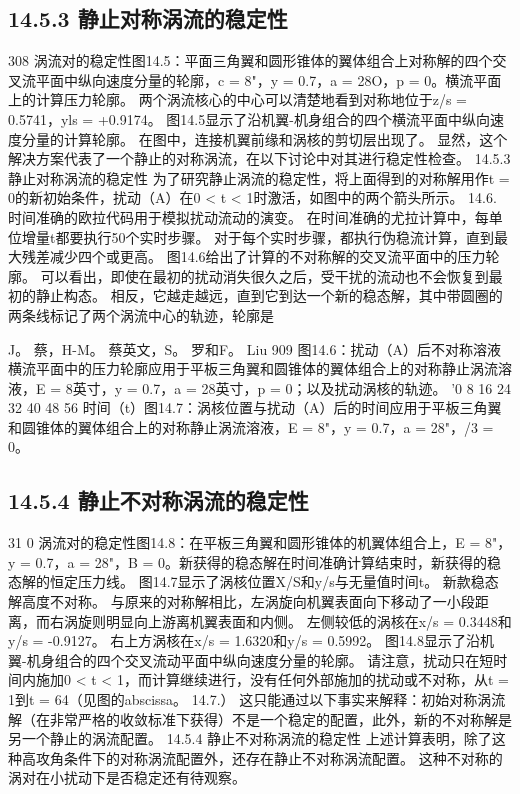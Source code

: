 \documentclass[UTF8,11pt,a4paper,openany,fontset=fandol]{ctexbook}
\begin{document}
\subsection{14.5.3 静止对称涡流的稳定性}
308 涡流对的稳定性图14.5：平面三角翼和圆形锥体的翼体组合上对称解的四个交叉流平面中纵向速度分量的轮廓，c = 8"，y = 0.7，a = 28O，p = 0。横流平面上的计算压力轮廓。 两个涡流核心的中心可以清楚地看到对称地位于z/s = 0.5741，yls = +0.9174。 图14.5显示了沿机翼-机身组合的四个横流平面中纵向速度分量的计算轮廓。 在图中，连接机翼前缘和涡核的剪切层出现了。 显然，这个解决方案代表了一个静止的对称涡流，在以下讨论中对其进行稳定性检查。 14.5.3 静止对称涡流的稳定性 为了研究静止涡流的稳定性，将上面得到的对称解用作t = 0的新初始条件，扰动（A）在0 < t < 1时激活，如图中的两个箭头所示。 14.6. 时间准确的欧拉代码用于模拟扰动流动的演变。 在时间准确的尤拉计算中，每单位增量t都要执行50个实时步骤。 对于每个实时步骤，都执行伪稳流计算，直到最大残差减少四个或更高。 图14.6给出了计算的不对称解的交叉流平面中的压力轮廓。 可以看出，即使在最初的扰动消失很久之后，受干扰的流动也不会恢复到最初的静止构态。 相反，它越走越远，直到它到达一个新的稳态解，其中带圆圈的两条线标记了两个涡流中心的轨迹，轮廓是

J。 蔡，H-M。 蔡英文，S。 罗和F。 Liu 909 图14.6：扰动（A）后不对称溶液横流平面中的压力轮廓应用于平板三角翼和圆锥体的翼体组合上的对称静止涡流溶液，E = 8英寸，y = 0.7，a = 28英寸，p = 0；以及扰动涡核的轨迹。 '0 8 16 24 32 40 48 56 时间（t）图14.7：涡核位置与扰动（A）后的时间应用于平板三角翼和圆锥体的翼体组合上的对称静止涡流溶液，E = 8"，y = 0.7，a = 28"，/3 = 0。

\subsection{14.5.4 静止不对称涡流的稳定性}
31 0 涡流对的稳定性图14.8：在平板三角翼和圆形锥体的机翼体组合上，E = 8"，y = 0.7，a = 28"，B = 0。新获得的稳态解在时间准确计算结束时，新获得的稳态解的恒定压力线。 图14.7显示了涡核位置X/S和y/s与无量值时间t。 新款稳态解高度不对称。 与原来的对称解相比，左涡旋向机翼表面向下移动了一小段距离，而右涡旋则明显向上游离机翼表面和内侧。 左侧较低的涡核在x/s = 0.3448和y/s = -0.9127。 右上方涡核在x/s = 1.6320和y/s = 0.5992。 图14.8显示了沿机翼-机身组合的四个交叉流动平面中纵向速度分量的轮廓。 请注意，扰动只在短时间内施加0 < t < 1，而计算继续进行，没有任何外部施加的扰动或不对称，从t = 1到t = 64（见图的abscissa。 14.7.） 这只能通过以下事实来解释：初始对称涡流解（在非常严格的收敛标准下获得）不是一个稳定的配置，此外，新的不对称解是另一个静止的涡流配置。 14.5.4 静止不对称涡流的稳定性 上述计算表明，除了这种高攻角条件下的对称涡流配置外，还存在静止不对称涡流配置。 这种不对称的涡对在小扰动下是否稳定还有待观察。
\end{document}
